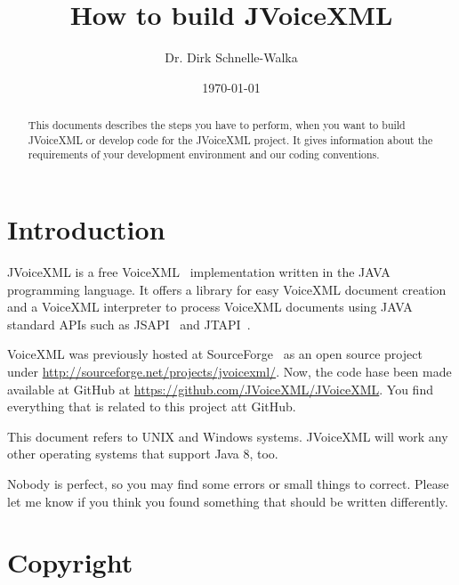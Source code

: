 \documentclass[11pt,a4paper]{article}
\title{How to build JVoiceXML \jvxmlversion}
\author{Dr. Dirk Schnelle-Walka}
\date{\today}
\begin{document}
\pagestyle{empty}

\maketitle

\pagestyle{headings}

\tableofcontents

\newpage

\begin{abstract}
This documents describes the steps you have to perform, when you want
to build JVoiceXML or develop code for the JVoiceXML project. It gives
information about the requirements of your development environment 
and our coding conventions.
\end{abstract}

\section{Introduction}
\label{sec:introduction}

JVoiceXML is a free VoiceXML~\cite{w3.org:voicexml} implementation written in 
the JAVA programming language. It offers a library for easy VoiceXML
document creation and a VoiceXML interpreter to process 
VoiceXML documents using JAVA standard APIs such as JSAPI~\cite{sun:jsapi} and
JTAPI~\cite{sun:jsapi}.

VoiceXML was previously hosted at SourceForge~\cite{sourceforge} as an open source project
under \url{http://sourceforge.net/projects/jvoicexml/}. Now, the code hase been made
available at GitHub at \url{https://github.com/JVoiceXML/JVoiceXML}.
You find everything that is related to this project att GitHub.

This document refers to UNIX and Windows systems. JVoiceXML will work 
any other operating systems that support Java 8, too.

Nobody is perfect, so you may find some errors or small things to correct.
Please let me know if you think you found something that should be written
differently.

\section{Copyright}
\label{sec:copyright}
\end{document}
